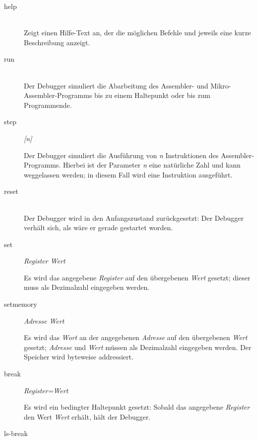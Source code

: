 \begin{description}
\item[help] \hspace*{\fill}\\

Zeigt einen Hilfe-Text an, der die möglichen Befehle und jeweils eine kurze Beschreibung anzeigt.

\item[run] \hspace*{\fill}\\

Der Debugger simuliert die Abarbeitung des Assembler- und Mikro-Assembler-Programms bis zu einem Haltepunkt oder bis zum Programmende.

\item[step] \emph{[n]}

Der Debugger simuliert die Ausführung von \emph{n} Instruktionen des Assembler-Programms. Hierbei ist der Parameter \emph{n} eine natürliche Zahl und kann weggelassen werden; in diesem Fall wird eine Instruktion ausgeführt.

\item[reset] \hspace*{\fill}\\

Der Debugger wird in den Anfangszustand zurückgesetzt: Der Debugger verhält sich, als wäre er gerade gestartet worden.

\item[set] \emph{Register Wert}

Es wird das angegebene \emph{Register} auf den übergebenen \emph{Wert} gesetzt; dieser muss als Dezimalzahl eingegeben werden.

\item[setmemory] \emph{Adresse Wert}

Es wird das \emph{Wort} an der angegebenen \emph{Adresse} auf den übergebenen \emph{Wert} gesetzt; \emph{Adresse} und \emph{Wert} müssen als Dezimalzahl eingegeben werden. Der Speicher wird byteweise addressiert.

\item[break] \emph{Register=Wert}

Es wird ein bedingter Haltepunkt gesetzt: Sobald das angegebene \emph{Register} den Wert \emph{Wert} erhält, hält der Debugger.

\item[ls-break] \hspace*{\fill}\\


\end{description}
